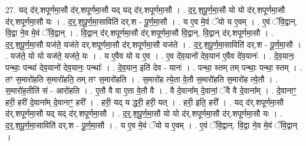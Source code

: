 \documentclass[17pt]{extarticle}
\begin{document}
27. यद् द॑र्.शपूर्णमा॒सौ द॑र्.शपूर्णमा॒सौ यद् यद् द॑र्.शपूर्णमा॒सौ । . द॒र्॒.श॒पू॒र्ण॒मा॒सौ यो यो द॑र्.शपूर्णमा॒सौ द॑र्.शपूर्णमा॒सौ यः । . द॒र्॒.श॒पू॒र्ण॒मा॒साविति॑ दर्.श - पू॒र्ण॒मा॒सौ । . य ए॒व मे॒वं ॅयो य ए॒वम् । . ए॒वं ॅवि॒द्वान्. वि॒द्वा ने॒व मे॒वं ॅवि॒द्वान् । . वि॒द्वान् द॑र्.शपूर्णमा॒सौ द॑र्.शपूर्णमा॒सौ वि॒द्वान्. वि॒द्वान् द॑र्.शपूर्णमा॒सौ । . द॒र्॒.श॒पू॒र्ण॒मा॒सौ यज॑ते॒ यज॑ते दर्.शपूर्णमा॒सौ द॑र्.शपूर्णमा॒सौ यज॑ते । . द॒र्॒.श॒पू॒र्ण॒मा॒साविति॑ दर्.श - पू॒र्ण॒मा॒सौ । . यज॑ते॒ यो यो यज॑ते॒ यज॑ते॒ यः । . य ए॒वैव यो य ए॒व । . ए॒व दे॑व॒यानो॑ देव॒यान॑ ए॒वैव दे॑व॒यानः॑ । . दे॒व॒यानः॒ पन्थाः॒ पन्था॑ देव॒यानो॑ देव॒यानः॒ पन्थाः᳚ । . दे॒व॒यान॒ इति॑ देव - यानः॑ । . पन्था॒ स्तम् तम् पन्थाः॒ पन्था॒ स्तम् । . तꣳ स॒मारो॑हति स॒मारो॑हति॒ तम् तꣳ स॒मारो॑हति । . स॒मारो॑ह त्ये॒ता वे॒तौ स॒मारो॑हति स॒मारो॑ह त्ये॒तौ । . स॒मारो॑ह॒तीति॑ सं - आरो॑हति । . ए॒तौ वै वा ए॒ता वे॒तौ वै । . वै दे॒वाना᳚म् दे॒वानां॒ ॅवै वै दे॒वाना᳚म् । . दे॒वानाꣳ॒॒ हरी॒ हरी॑ दे॒वाना᳚म् दे॒वानाꣳ॒॒ हरी᳚ । . हरी॒ यद् य द्धरी॒ हरी॒ यत् । . हरी॒ इति॒ हरी᳚ । . यद् द॑र्.शपूर्णमा॒सौ द॑र्.शपूर्णमा॒सौ यद् यद् द॑र्.शपूर्णमा॒सौ । . द॒र्॒.श॒पू॒र्ण॒मा॒सौ यो यो द॑र्.शपूर्णमा॒सौ द॑र्.शपूर्णमा॒सौ यः । . द॒र्॒.श॒पू॒र्ण॒मा॒साविति॑ दर्.श - पू॒र्ण॒मा॒सौ । . य ए॒व मे॒वं ॅयो य ए॒वम् । . ए॒वं ॅवि॒द्वान्. वि॒द्वा ने॒व मे॒वं ॅवि॒द्वान् । \newline
\end{document}
